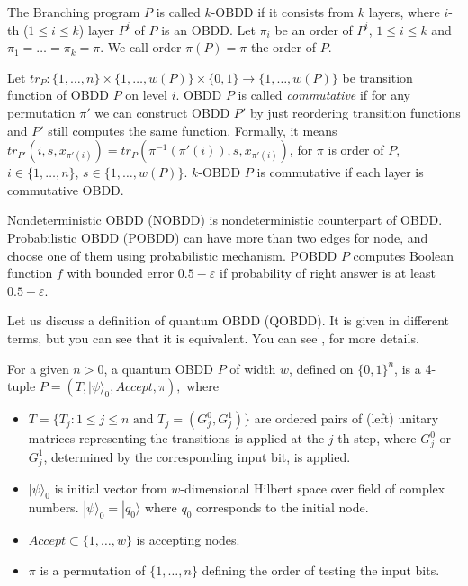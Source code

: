 \documentclass{llncs}
\newcommand{\kobdd}{$k$-OBDD }
\newcommand{\ket}[1]{|#1\rangle}
\begin{document}
The Branching program $P$ is called $k$-OBDD if it consists from $k$ layers, where  $i$-th ($1\le i\le k$) layer  $P^i$ of $P$  is  an OBDD. Let  $\pi_i$ be an order of $P^i$, $1\le i\le k$ and $\pi_1=\dots=\pi_k=\pi$.
 We call  order
$\pi(P)=\pi$ the order of $P$.

Let $tr_P:\{1,\dots,n\}\times\{1,\dots,w(P)\}\times\{0,1\}\to\{1,\dots,w(P)\}$ be transition function of OBDD $P$ on level $i$.
OBDD $P$ is called {\em commutative} if for any permutation $\pi'$ we can construct OBDD $P'$ by just reordering transition functions and $P'$ still  computes the same function. Formally, it means $tr_{P'}(i,s,x_{\pi'(i)})=tr_{P}(\pi^{-1}(\pi'(i)),s, x_{\pi'(i)})$, for $\pi$ is order of $P$, $i\in \{1,\dots,n\}$, $s\in \{1,\dots,w(P)\}$. $k$-OBDD $P$ is commutative if each layer is commutative OBDD.

Nondeterministic OBDD (NOBDD) is nondeterministic counterpart of OBDD.
Probabilistic OBDD (POBDD) can have more than two edges for node, and choose one of them using probabilistic mechanism. POBDD $P$ computes Boolean function $f$ with bounded error $0.5-\varepsilon$ if probability of right answer is at least $0.5+\varepsilon$.


Let us discuss a definition of quantum OBDD (QOBDD). It is given in different terms, but you can see that it is equivalent. You can see \cite{agkmp2005}, \cite{agk01} for more details.

For a given $ n>0 $, a quantum OBDD $ P$ of width $w$, defined on $ \{0,1\}^n $, is a 4-tuple
$
	P=(T,\ket{\psi}_0,Accept,\pi),
$
where
\begin{itemize}
	\item $ T = \{ T_j : 1 \leq j \leq n \mbox{ and } T_j = (G_j^0,G_j^1)  \} $ are  ordered pairs of (left) unitary matrices representing the transitions is applied at the $j$-th step, where $ G_j^0 $ or $ G_j^1 $, determined by the corresponding input bit, is applied.
	\item $\ket{\psi}_0$ is initial vector from $ w $-dimensional Hilbert space over field of complex numbers.  $ \ket{\psi}_0=\ket{q_0}$ where $ q_0 $ corresponds to the initial node.
	\item $ Accept \subset \{1,\ldots,w\} $ is accepting nodes.
\item $ \pi $ is a permutation of $ \{1,\ldots,n\} $ defining the order of testing the input bits.
\end{itemize}
\end{document}
